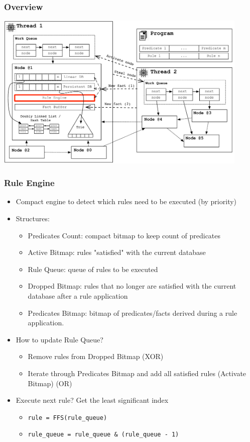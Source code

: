 \documentclass{beamer}
\begin{document}
\begin{frame}[fragile]
   \frametitle{Overview}
   \includegraphics[height=7.5cm]{overview3.pdf}
\end{frame}

\begin{frame}[fragile]
   \frametitle{Rule Engine}
   \begin{itemize}
      \item Compact engine to detect which rules need to be executed (by priority)
      \item Structures:
      \begin{itemize}
         \item Predicates Count: compact bitmap to keep count of predicates
         \item Active Bitmap: rules "satisfied" with the current database
         \item Rule Queue: queue of rules to be executed
         \item Dropped Bitmap: rules that no longer are satisfied with the current database after a rule application
         \item Predicates Bitmap: bitmap of predicates/facts derived during a rule application.
      \end{itemize}
      \item How to update Rule Queue?
      \begin{itemize}
         \item Remove rules from Dropped Bitmap (XOR)
         \item Iterate through Predicates Bitmap and add all satisfied rules (Activate Bitmap) (OR)
      \end{itemize}
      \item Execute next rule? Get the least significant index
      \begin{itemize}
         \item \texttt{rule = FFS(rule\_queue)}
         \item \texttt{rule\_queue = rule\_queue \& (rule\_queue - 1)}
      \end{itemize}
   \end{itemize}
\end{frame}
\end{document}
